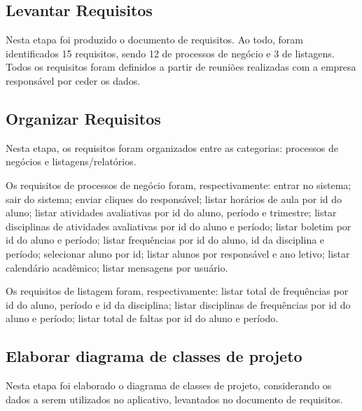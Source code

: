 \subsection{Levantar Requisitos}

Nesta etapa foi produzido o documento de requisitos. Ao todo, foram identificados 15 requisitos, sendo 12 de processos de negócio e 3 de listagens. Todos os requisitos foram definidos a partir de reuniões realizadas com a empresa responsável por ceder os dados.

\subsection{Organizar Requisitos}

Nesta etapa, os requisitos foram organizados entre as categorias: processos de negócios e listagens/relatórios.

Os requisitos de processos de negócio foram, respectivamente: entrar no sistema; sair do sistema; enviar cliques do responsável; listar horários de aula por id do aluno; listar atividades avaliativas por id do aluno, período e trimestre; listar disciplinas de atividades avaliativas por id do aluno e período; listar boletim por id do aluno e período; listar frequências por id do aluno, id da disciplina e período; selecionar aluno por id; listar alunos por responsável e ano letivo; listar calendário acadêmico; listar mensagens por usuário.

Os requisitos de listagem foram, respectivamente: listar total de frequências por id do aluno, período e id da disciplina; listar disciplinas de frequências por id do aluno e período; listar total de faltas por id do aluno e período.

\subsection{Elaborar diagrama de classes de projeto}

Nesta etapa foi elaborado o diagrama de classes de projeto, considerando os dados a serem utilizados no aplicativo, levantados no documento de requisitos.

